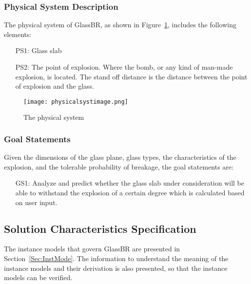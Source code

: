 \documentclass[12pt]{article}
\begin{document}
\subsubsection{Physical System Description}
\label{Sec:PhysSystDesc}
The physical system of GlassBR, as shown in Figure~\ref{Figure:Thephyssyst}, includes the following elements:
\begin{itemize}
\item[PS1:]Glass slab
\item[PS2:]The point of explosion. Where the bomb, or any kind of man-made explosion, is located. The stand off distance is the distance between the point of explosion and the glass.
\end{itemize}
\begin{figure}
\begin{center}
\texttt{[image: physicalsystimage.png]}
\caption{The physical system}
\label{Figure:Thephyssyst}
\end{center}
\end{figure}
\subsubsection{Goal Statements}
\label{Sec:GoalStat}
Given the dimensions of the glass plane, glass types, the characteristics of the explosion, and the tolerable probability of breakage, the goal statements are:
\begin{itemize}
\item[GS1:]Analyze and predict whether the glass slab under consideration will be able to withstand the explosion of a certain degree which is calculated based on user input.
\end{itemize}
\subsection{Solution Characteristics Specification}
\label{Sec:SoluCharSpec}
The instance models that govern GlassBR are presented in Section~\ref{Sec:InstMode}. The information to understand the meaning of the instance models and their derivation is also presented, so that the instance models can be verified.
\end{document}
